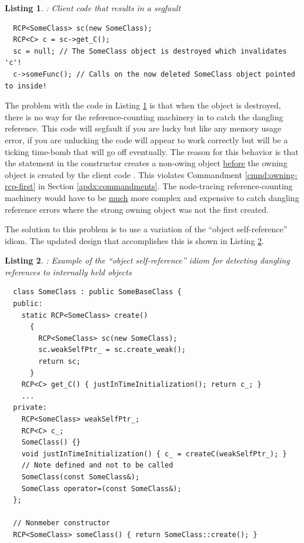 \documentclass[pdf,ps2pdf,11pt]{SANDreport}
\newtheorem{listing}{Listing}
\begin{document}
\begin{listing}: Client code that results in a segfault  \\
\label{listing:osr:bad-use-SomeClass}
{\small\begin{verbatim}
  RCP<SomeClass> sc(new SomeClass);
  RCP<C> c = sc->get_C();
  sc = null; // The SomeClass object is destroyed which invalidates 'c'!
  c->someFunc(); // Calls on the now deleted SomeClass object pointed to inside!
\end{verbatim}}
\end{listing}


The problem with the code in Listing
{}\ref{listing:osr:bad-use-SomeClass} is that when the
{} object {} is destroyed, there is no
way for the reference-counting machinery in to catch the dangling
reference.  This code will segfault if you are lucky but like any
memory usage error, if you are unlucking the code will appear to work
correctly but will be a ticking time-bomb that will go off eventually.
The reason for this behavior is that the statement {} in the constructor {}
creates a non-owing {} object {}\underline{before} the
owning {} object is created by the client code
{}.  This violates
Commandment {}\ref{cmnd:owning-rcp-first} in Section
{}\ref{apdx:commandments}.  The node-tracing reference-counting
machinery would have to be {}\underline{much} more complex and
expensive to catch dangling reference errors where the strong owning
{} object was not the first created.

The solution to this problem is to use a variation of the ``object
self-reference'' idiom.  The updated design that accomplishes this is
shown in Listing {}\ref{listing:osr:SomeClass-refactored}.


\begin{listing}:  Example of the ``object self-reference'' idiom for
detecting dangling references to internally held objects  \\
\label{listing:osr:SomeClass-refactored}
{\small\begin{verbatim}
  class SomeClass : public SomeBaseClass {
  public:
    static RCP<SomeClass> create()
      {
        RCP<SomeClass> sc(new SomeClass);
        sc.weakSelfPtr_ = sc.create_weak();
        return sc;
      }
    RCP<C> get_C() { justInTimeInitialization(); return c_; }
    ...
  private:
    RCP<SomeClass> weakSelfPtr_;
    RCP<C> c_;
    SomeClass() {}
    void justInTimeInitialization() { c_ = createC(weakSelfPtr_); }
    // Note defined and not to be called
    SomeClass(const SomeClass&);
    SomeClass operator=(const SomeClass&);
  };

  // Nonmeber constructor
  RCP<SomeClass> someClass() { return SomeClass::create(); }
\end{verbatim}}
\end{listing}
\end{document}
